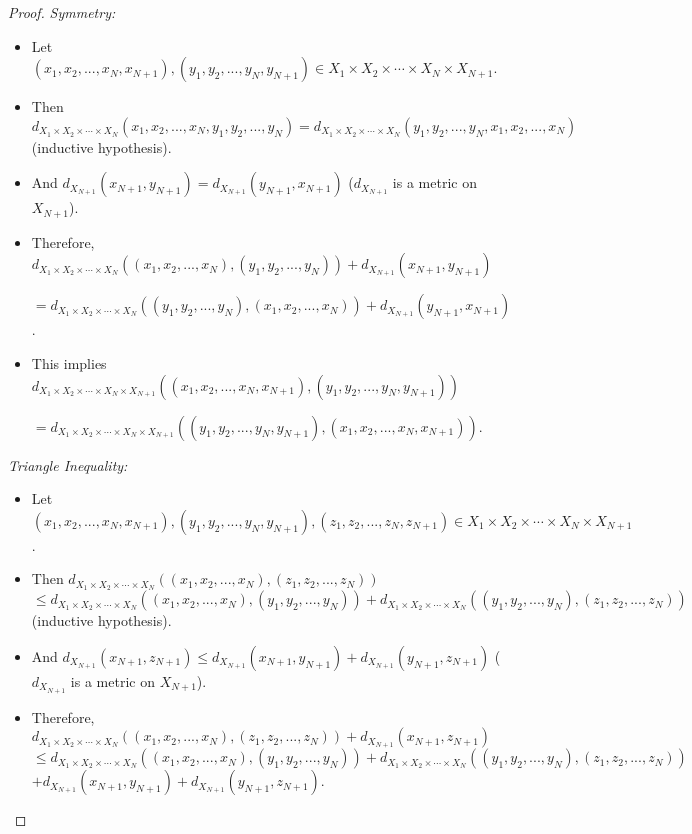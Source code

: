 \documentclass[10pt]{article}
\newenvironment{problem}[2][Problem]{\begin{trivlist}
\item[\hskip \labelsep {\bfseries #1}\hskip \labelsep {\bfseries #2.}]}{\end{trivlist}}
\begin{document}
\begin{problem}{3}
\begin{enumerate}
\begin{proof}
                \textit{Symmetry:}
                \begin{itemize}
                    \item Let $(x_1, x_2, ..., x_N, x_{N+1}), (y_1, y_2, ..., y_N, y_{N+1}) \in X_1 \times X_2 \times \cdots \times X_N \times X_{N+1}$.
                    \item Then $d_{X_1 \times X_2 \times \cdots \times X_N}(x_1, x_2, ..., x_N, y_1, y_2, ..., y_N) = d_{X_1 \times X_2 \times \cdots \times X_N}(y_1, y_2, ..., y_N, x_1, x_2, ..., x_N)$ \\ (inductive hypothesis).
                    \item And $d_{X_{N+1}}(x_{N+1}, y_{N+1}) = d_{X_{N+1}}(y_{N+1}, x_{N+1})$ ($d_{X_{N+1}}$ is a metric on $X_{N+1}$).
                    \item Therefore, $d_{X_1 \times X_2 \times \cdots \times X_N}((x_1, x_2, ..., x_N), (y_1, y_2, ..., y_N)) + d_{X_{N+1}}(x_{N+1}, y_{N+1})$

                        $= d_{X_1 \times X_2 \times \cdots \times X_N}((y_1, y_2, ..., y_N), (x_1, x_2, ..., x_N)) + d_{X_{N+1}}(y_{N+1}, x_{N+1})$.
                    \item This implies $d_{X_1 \times X_2 \times \cdots \times X_N \times X_{N+1}}((x_1, x_2, ..., x_N, x_{N+1}), (y_1, y_2, ..., y_N, y_{N+1})) $

                        $= d_{X_1 \times X_2 \times \cdots \times X_N \times X_{N+1}}((y_1, y_2, ..., y_N, y_{N+1}), (x_1, x_2, ..., x_N, x_{N+1}))$.
                \end{itemize}

                \textit{Triangle Inequality:}

                \begin{itemize}
                    \item Let $(x_1, x_2, ..., x_N, x_{N+1}), (y_1, y_2, ..., y_N, y_{N+1}), (z_1, z_2, ..., z_N, z_{N+1}) \in X_1 \times X_2 \times \cdots \times X_N \times X_{N+1}$.
                    \item Then $d_{X_1 \times X_2 \times \cdots \times X_N}((x_1, x_2, ..., x_N), (z_1, z_2, ..., z_N)) $ \\$ \leq d_{X_1 \times X_2 \times \cdots \times X_N}((x_1, x_2, ..., x_N), (y_1, y_2, ..., y_N)) + d_{X_1 \times X_2 \times \cdots \times X_N}((y_1, y_2, ..., y_N), (z_1, z_2, ..., z_N))$ (inductive hypothesis).
                    \item And $d_{X_{N+1}}(x_{N+1}, z_{N+1}) \leq d_{X_{N+1}}(x_{N+1}, y_{N+1}) + d_{X_{N+1}}(y_{N+1}, z_{N+1})$ ($d_{X_{N+1}}$ is a metric on $X_{N+1}$).
                    \item Therefore, $d_{X_1 \times X_2 \times \cdots \times X_N}((x_1, x_2, ..., x_N), (z_1, z_2, ..., z_N)) + d_{X_{N+1}}(x_{N+1}, z_{N+1})$ \\ $\leq d_{X_1 \times X_2 \times \cdots \times X_N}((x_1, x_2, ..., x_N), (y_1, y_2, ..., y_N)) + d_{X_1 \times X_2 \times \cdots \times X_N}((y_1, y_2, ..., y_N), (z_1, z_2, ..., z_N))$ \\ $ + d_{X_{N+1}}(x_{N+1}, y_{N+1}) + d_{X_{N+1}}(y_{N+1}, z_{N+1})$.


\end{itemize}
\end{proof}
\end{enumerate}
\end{problem}
\end{document}
